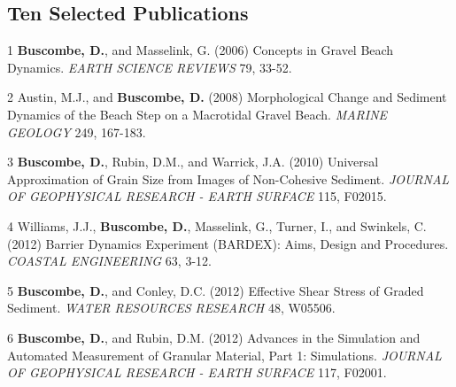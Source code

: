 \documentclass[margin,line]{resume}
\begin{document}
\begin{resume}
    \section{\mysidestyle Ten Selected Publications}

        \begin{footnotesize}
	\begin{list1}
	\item[1] {\bf Buscombe, D.}, and Masselink, G. (2006) Concepts in Gravel Beach Dynamics. {\sl EARTH SCIENCE REVIEWS} 79, 33-52.\\
	
	
	\item[2] Austin, M.J., and {\bf Buscombe, D.} (2008) Morphological Change and Sediment Dynamics of the Beach Step on a Macrotidal Gravel Beach. {\sl MARINE GEOLOGY} 249, 167-183. \\

	\item[3] {\bf Buscombe, D.}, Rubin, D.M., and Warrick, J.A. (2010) Universal Approximation of Grain Size from Images of Non-Cohesive Sediment. {\sl JOURNAL OF GEOPHYSICAL RESEARCH - EARTH SURFACE} 115, F02015.\\

	\item[4] Williams, J.J., {\bf Buscombe, D.}, Masselink, G., Turner, I., and Swinkels, C. (2012) Barrier Dynamics Experiment (BARDEX): Aims, Design and Procedures. {\sl COASTAL ENGINEERING} 63, 3-12.\\

	\item[5] {\bf Buscombe, D.}, and Conley, D.C. (2012) Effective Shear Stress of Graded Sediment. {\sl WATER RESOURCES RESEARCH} 48, W05506.\\

	\item[6] {\bf Buscombe, D.}, and Rubin, D.M. (2012) Advances in the Simulation and Automated Measurement of Granular Material, Part 1: Simulations. {\sl JOURNAL OF GEOPHYSICAL RESEARCH - EARTH SURFACE} 117, F02001.\\


\end{list1}
\end{footnotesize}
\end{resume}
\end{document}
